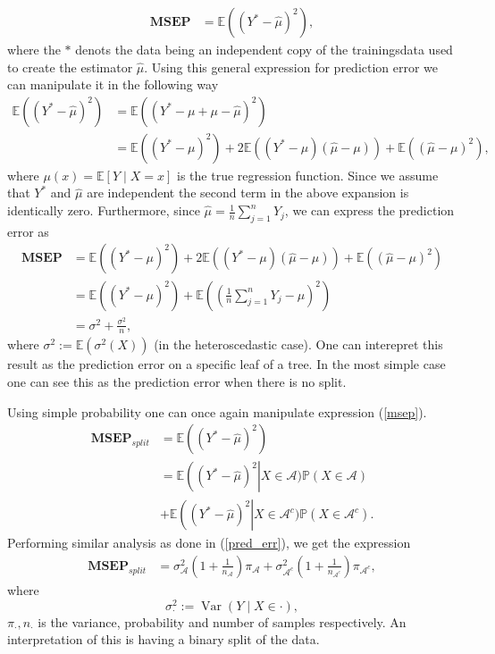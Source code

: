 \documentclass{article}
\theoremstyle{definition}
\theoremstyle{remark}
\newcommand{\E }{\mathbb{E}}  %
\renewcommand{\P}{\mathbb{P}}  %
\newcommand{\Var}{\operatorname{Var}}  %
\begin{document}
\begin{align}
	\textbf{MSEP} & = \E \left( (Y^* - \widehat\mu)^2 \right),
	\label{msep}
\end{align}
where the $ * $ denots the data being an independent copy of the trainingsdata
used to create the estimator $ \widehat\mu $. Using this general expression for
prediction error we can manipulate it in the following way
\begin{align}
	\E \left( (Y^* - \widehat\mu)^2 \right) & = \E \left( (Y^* - \mu + \mu -
	\widehat\mu)^2 \right)                                                        \\
	                                        & = \E \left( (Y^* - \mu)^2 \right) +
	2\E \left( (Y^* - \mu)(\widehat \mu - \mu) \right)  +
	\E \left( (\widehat\mu - \mu)^2 \right),
\end{align}
where $ \mu (x) = \E[Y \mid X =x] $ is the true regression function. Since we assume that $ Y^* $ and $ \widehat\mu $ are independent the second term
in the above expansion is identically zero. Furthermore, since $ \widehat\mu =
	\frac{1}{n}\sum_{j=1}^{n} Y_j$, we can express the prediction error as
\begin{align}
	\textbf{MSEP} & = \E \left( (Y^* - \mu)^2 \right) +
	2\E \left( (Y^* - \mu)(\widehat \mu - \mu) \right)  +
	\E \left( (\widehat\mu - \mu)^2 \right)                   \\
	              & = \E \left( (Y^* - \mu)^2 \right) +
	\E \left( (\frac{1}{n}\sum_{j=1}^{n} Y_j - \mu)^2 \right) \\
	              & = \sigma^2 + \frac{\sigma^2}{n},
	\label{pred_err}
\end{align}
where $\sigma^2 := \E(\sigma^2(X))$ (in the heteroscedastic case). One can interepret this result as the prediction error on a specific leaf of a
tree. In the most simple case one can see this as the prediction error when
there is no split.

Using simple probability one can once again manipulate
expression (\ref{msep}).
\begin{align}
	\textbf{MSEP}_{split} & = \E \left( (Y^* - \widehat\mu)^2 \right)        \\
	                      & = \E \left( (Y^* - \widehat\mu)^2 \right | X \in
	\mathcal{A})\P(X \in \mathcal{A})                                        \\
	                      & + \E \left( (Y^* - \widehat\mu)^2 \right | X \in
	\mathcal{A}^c)\P(X \in \mathcal{A}^c).
\end{align}
Performing similar analysis as done in (\ref{pred_err}), we get the expression
\begin{align}
	\textbf{MSEP}_{split} & = \sigma^2_{\mathcal{A}}( 1 + \frac{1}{n_{\mathcal{A}} })\pi_{\mathcal{A}} +
	\sigma^2_{\mathcal{A}^c}(1 + \frac{1}{n_{\mathcal{A}^c}})\pi_{\mathcal{A}^c},
\end{align}
where
$$
	\sigma^2_{\cdot} := \Var\left(Y \mid X \in \cdot \right),
$$
$\pi_{\cdot}, n_{\cdot}$ is the
variance, probability and number of samples respectively. An interpretation of
this is having a binary split of the data.
\end{document}
